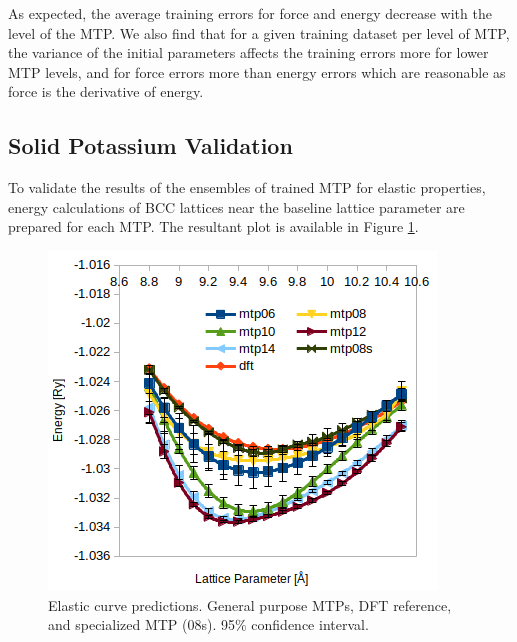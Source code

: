 \documentclass[9pt,twocolumn,twoside]{opticajnl}
\begin{document}
As expected, the average training errors for force and energy decrease with the level of the MTP. We also find that for a given training dataset per level of MTP, the variance of the initial parameters affects the training errors more for lower MTP levels, and for force errors more than energy errors which are reasonable as force is the derivative of energy. 

\subsection{Solid Potassium Validation}
To validate the results of the ensembles of trained MTP for elastic properties, energy calculations of BCC lattices near the baseline lattice parameter are prepared for each MTP. The resultant plot is available in Figure \ref{fig:elastic}.

\begin{figure}[ht]
  \centering
  \includegraphics[width=\linewidth]{assets/curve.png}
  \caption{Elastic curve predictions. General purpose MTPs, DFT reference, and specialized MTP (08s). 95\% confidence interval.}
  \label{fig:elastic}
\end{figure}
\end{document}
